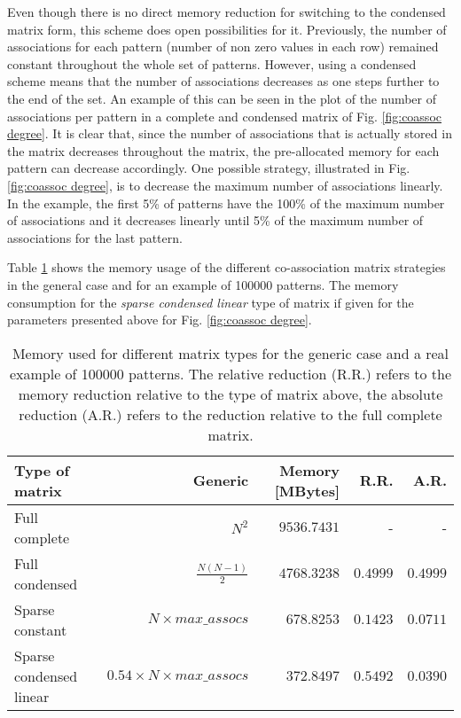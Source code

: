 Even though there is no direct memory reduction for switching to the condensed matrix form, this scheme does open possibilities for it.
Previously, the number of associations for each pattern (number of non zero values in each row) remained constant throughout the whole set of patterns.
However, using a condensed scheme means that the number of associations decreases as one steps further to the end of the set. %
An example of this can be seen in the plot of the number of associations per pattern in a complete and condensed matrix of Fig. \ref{fig:coassoc degree}.
It is clear that, since the number of associations that is actually stored in the matrix decreases throughout the matrix, the pre-allocated memory for each pattern can decrease accordingly.
One possible strategy, illustrated in Fig. \ref{fig:coassoc degree}, is to decrease the maximum number of associations linearly.
In the example, the first 5\% of patterns have the 100\% of the maximum number of associations and it decreases linearly until 5\% of the maximum number of associations for the last pattern.

Table \ref{tab:mat type memory} shows the memory usage of the different co-association matrix strategies in the general case and for an example of 100000 patterns.
The memory consumption for the \emph{sparse condensed linear} type of matrix if given for the parameters presented above for Fig. \ref{fig:coassoc degree}.

\begin{table}[hbtp]
\centering
\caption{Memory used for different matrix types for the generic case and a real example of 100000 patterns. The relative reduction (R.R.) refers to the memory reduction relative to the type of matrix above, the absolute reduction (A.R.) refers to the reduction relative to the full complete matrix.}
\label{tab:mat type memory}
\begin{tabular}{lrrrr}
\toprule
\textbf{Type of matrix}          & \textbf{Generic}                & \textbf{Memory {[}MBytes{]}}    & \textbf{R.R.} & \textbf{A.R.} \\
\midrule%
Full complete           & $N^2$                  & $9536.7431$              & -                  & -             \\
Full condensed          & $\frac{N(N-1)}{2}$     & $4768.3238$              & $0.4999$     & $0.4999$      \\
Sparse constant         & $ N \times max\_assocs$ & $678.8253$               & $0.1423$           & $0.0711$      \\
Sparse condensed linear & $ 0.54 \times N \times max\_assocs$ & $372.8497$               & $0.5492$           & $0.0390$      \\
\bottomrule
\end{tabular}
\end{table}


